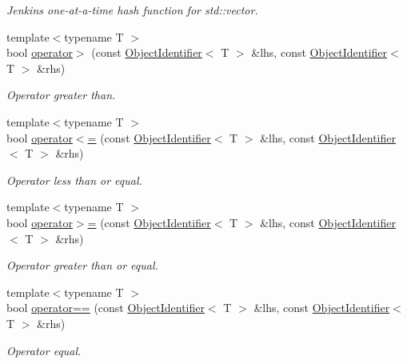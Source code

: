 \begin{DoxyCompactItemize}
\begin{DoxyCompactList}\small\item\em Jenkins one-\/at-\/a-\/time hash function for std\-::vector. \end{DoxyCompactList}\item 
{\footnotesize template$<$typename T $>$ }\\bool \hyperlink{namespaceshad_a6eca4ffdbc7555d2e0b549a0a6eeffdd}{operator$>$} (const \hyperlink{classshad_1_1ObjectIdentifier}{Object\-Identifier}$<$ T $>$ \&lhs, const \hyperlink{classshad_1_1ObjectIdentifier}{Object\-Identifier}$<$ T $>$ \&rhs)
\begin{DoxyCompactList}\small\item\em Operator greater than. \end{DoxyCompactList}\item 
{\footnotesize template$<$typename T $>$ }\\bool \hyperlink{namespaceshad_a3c37dd61ed6b63c4eb35b3bc7c35d6c0}{operator$<$=} (const \hyperlink{classshad_1_1ObjectIdentifier}{Object\-Identifier}$<$ T $>$ \&lhs, const \hyperlink{classshad_1_1ObjectIdentifier}{Object\-Identifier}$<$ T $>$ \&rhs)
\begin{DoxyCompactList}\small\item\em Operator less than or equal. \end{DoxyCompactList}\item 
{\footnotesize template$<$typename T $>$ }\\bool \hyperlink{namespaceshad_a59733f17e9061a22cd234fcfa3e022ff}{operator$>$=} (const \hyperlink{classshad_1_1ObjectIdentifier}{Object\-Identifier}$<$ T $>$ \&lhs, const \hyperlink{classshad_1_1ObjectIdentifier}{Object\-Identifier}$<$ T $>$ \&rhs)
\begin{DoxyCompactList}\small\item\em Operator greater than or equal. \end{DoxyCompactList}\item 
{\footnotesize template$<$typename T $>$ }\\bool \hyperlink{namespaceshad_a82a20cc9e8de1bf3341c2506f7c1abc9}{operator==} (const \hyperlink{classshad_1_1ObjectIdentifier}{Object\-Identifier}$<$ T $>$ \&lhs, const \hyperlink{classshad_1_1ObjectIdentifier}{Object\-Identifier}$<$ T $>$ \&rhs)
\begin{DoxyCompactList}\small\item\em Operator equal. \end{DoxyCompactList}\item 

\end{DoxyCompactItemize}
